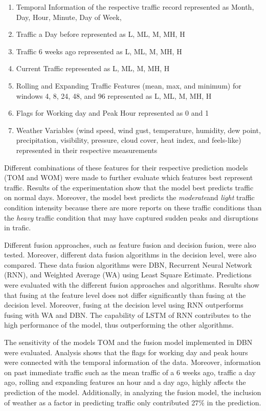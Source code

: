 \begin{enumerate}
\item Temporal Information of the respective traffic record represented as Month, Day, Hour, Minute, Day of Week,
\item Traffic a Day before represented as L, ML, M, MH, H
\item Traffic 6 weeks ago represented as L, ML, M, MH, H
\item Current Traffic represented as L, ML, M, MH, H
\item Rolling and Expanding Traffic Features (mean, max, and minimum) for windows 4, 8, 24, 48, and 96 represented as L, ML, M, MH, H
\item Flags for Working day and Peak Hour represented as 0 and 1
\item Weather Variables (wind speed, wind gust, temperature, humidity, dew point, precipitation, visibility, pressure, cloud cover, heat index, and feels-like) represented in their respective measurements 
\end{enumerate}

Different combinations of these features for their respective prediction models (TOM and WOM) were made to further evaluate which features best represent traffic. Results of the experimentation show that the model best predicts traffic on normal days. Moreover, the model best predicts the \textit{moderate}and \textit{light} traffic condition intensity because there are more reports on these traffic conditions than the \textit{heavy} traffic condition that may have captured sudden peaks and disruptions in trafic. 

Different fusion approaches, such as feature fusion and decision fusion, were also tested. Moreover, different data fusion algorithms in the decision level,  were also compared. These data fusion algorithms were DBN, Recurrent Neural Network (RNN), and Weighted Average (WA) using Least Square Estimate. Predictions were evaluated with the different fusion approaches and algorithms. Results show that fusing at the feature level does not differ significantly than fusing at the decision level. Moreover, fusing at the decision level using RNN outperforms fusing with WA and DBN. The capability of LSTM of RNN contributes to the high performance of the model, thus outperforming the other algorithms. 

The sensitivity of the models TOM and the fusion model implemented in DBN were evaluated. Analysis shows that the flags for working day and peak hours were connected with the temporal information of the data. Moreover, information on past immediate traffic such as the mean traffic of a 6 weeks ago, traffic a day ago, rolling and expanding features an hour and a day ago, highly affects the prediction of the model. Additionally, in analyzing the fusion model, the inclusion of weather as a factor in predicting traffic only contributed 27\% in the prediction. 

